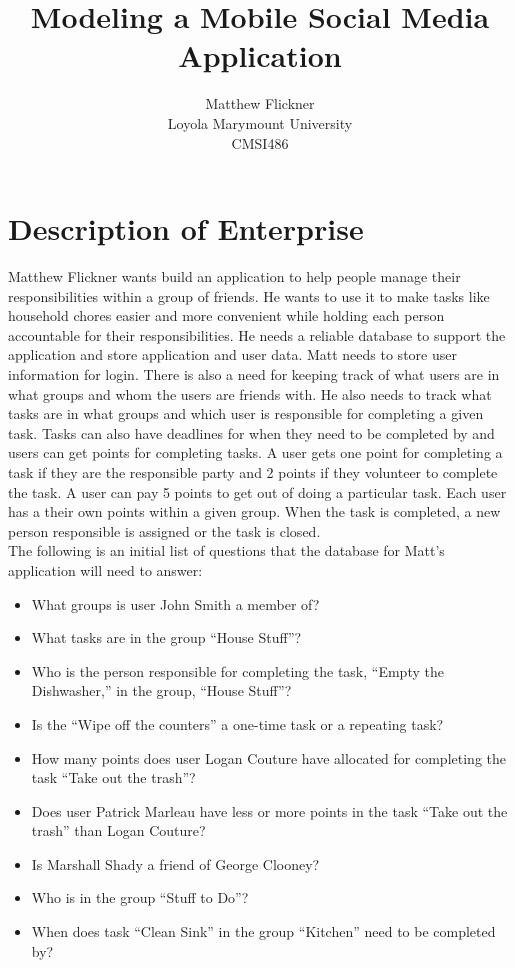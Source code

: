 \documentclass[11pt, a4paper]{report}
\title{Modeling a Mobile Social Media Application}
\author{Matthew Flickner \\ Loyola Marymount University\\ CMSI486}
\providecommand\phantomsection{}
\begin{document}
\clearpage
\phantomsection
{}
\maketitle


\tableofcontents
\newpage

\chapter{Description of Enterprise}
Matthew Flickner wants build an application to help people manage their responsibilities within a group of friends. He wants to use it to make tasks like household chores easier and more convenient while holding each person accountable for their responsibilities. He needs a reliable database to support the application and store application and user data. Matt needs to store user information for login. There is also a need for keeping track of what users are in what groups and whom the users are friends with. He also needs to track what tasks are in what groups and which user is responsible for completing a given task. Tasks can also have deadlines for when they need to be completed by and users can get points for completing tasks. A user gets one point for completing a task if they are the responsible party and 2 points if they volunteer to complete the task. A user can pay 5 points to get out of doing a particular task. Each user has a their own points within a given group. When the task is completed, a new person responsible is assigned or the task is closed.
\\
The following is an initial list of questions that the database for Matt’s application will need to answer:
\begin{itemize}
\item What groups is user John Smith a member of?
\item What tasks are in the group “House Stuff”?
\item Who is the person responsible for completing the task, “Empty the Dishwasher,” in the group, “House Stuff”?
\item Is the “Wipe off the counters” a one-time task or a repeating task?
\item How many points does user Logan Couture have allocated for completing the task “Take out the trash”?
\item Does user Patrick Marleau have less or more points in the task “Take out the trash” than Logan Couture?
\item Is Marshall Shady a friend of George Clooney?
\item Who is in the group “Stuff to Do”?
\item When does task “Clean Sink” in the group “Kitchen” need to be completed by?
\end{itemize}
\end{document}
